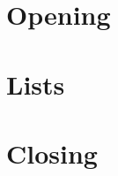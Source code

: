 \documentclass[aspectratio=169]{beamer}
\newcommand{\studiocataloguename}{}
\begin{document}
\section{Opening}
\gdef\studiocataloguename{\detokenize{contents-five}}
\gdef\studiocataloguename{\detokenize{team-presentation}}
\section{Lists}
\gdef\studiocataloguename{\detokenize{list-rail-five}}
\section{Closing}
\gdef\studiocataloguename{\detokenize{closing}}
\end{document}
